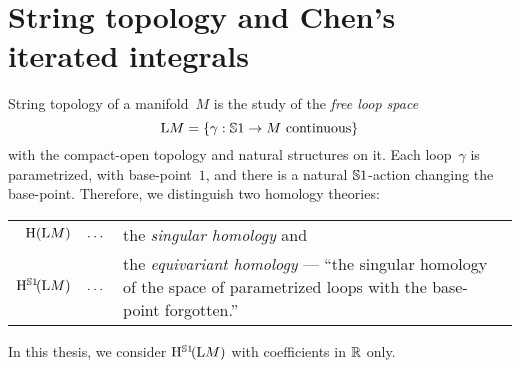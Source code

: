 \documentclass[\MainFolder/Text.tex]{subfiles}
\begin{document}
\section{String topology and Chen's iterated integrals}

String topology of a manifold~$M$ is the study of the \emph{free loop space} 
$$ \mathrm{L} M = \{\gamma: \mathbb{S}{1}\rightarrow M\text{ continuous}\} $$
with the compact-open topology and natural structures on it. Each loop~$\gamma$ is parametrized, with base-point~$1$, and there is a natural $\mathbb{S}{1}$-action changing the base-point. Therefore, we distinguish two homology theories:
\begin{center}
\begin{tabular}{rl}
 $\mathrm{H}(\mathrm{L} M)\quad\dotsc$& the \emph{singular homology} and \\[1ex]
 $\mathrm{H}^{\mathbb{S}{1}}\!(\mathrm{L} M)\quad\dotsc$ & \parbox[t]{10cm}{the \emph{equivariant homology} --- ``the singular homology of the space of parametrized loops with the base-point forgotten.''}
\end{tabular}
\end{center}
In this thesis, we consider $\mathrm{H}^{\mathbb{S}{1}}\!(\mathrm{L} M)$ with coefficients in $\mathbb{R}$ only.
\end{document}
